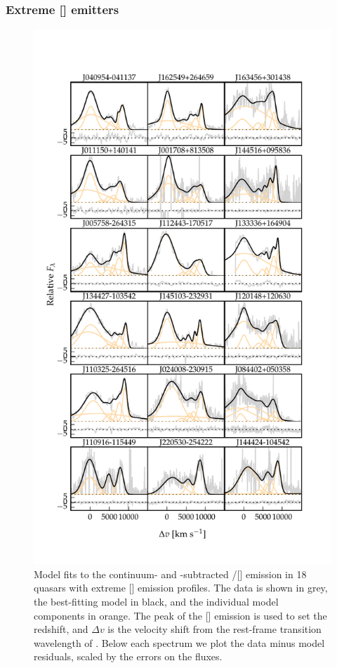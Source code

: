 \subsubsection{Extreme [] emitters}

\begin{figure}
    \centering
    \includegraphics[width=\columnwidth]{figures/chapter04/example_spectrum_grid_extreme_oiii.pdf} 
    \caption[{Model fits to the continuum- and -subtracted \hbns/[] emission in 18 quasars with extreme [] emission profiles.}]{Model fits to the continuum- and -subtracted \hbns/[] emission in 18 quasars with extreme [] emission profiles. The data is shown in grey, the best-fitting model in black, and the individual model components in orange. The peak of the [] emission is used to set the redshift, and $\Delta{v}$ is the velocity shift from the rest-frame transition wavelength of \hb. Below each spectrum we plot the data minus model residuals, scaled by the errors on the fluxes.}     
    \label{fig:example_spectrum_grid_extreme_oiii}
\end{figure}

